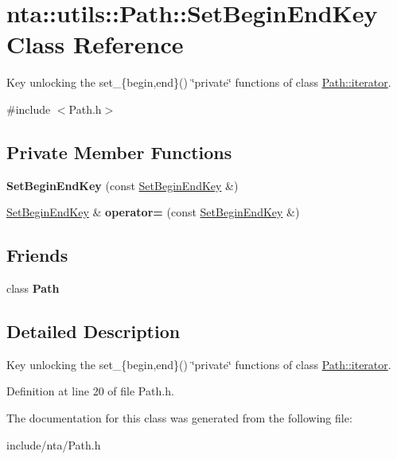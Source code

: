 \hypertarget{classnta_1_1utils_1_1Path_1_1SetBeginEndKey}{}\section{nta\+:\+:utils\+:\+:Path\+:\+:Set\+Begin\+End\+Key Class Reference}
\label{classnta_1_1utils_1_1Path_1_1SetBeginEndKey}


Key unlocking the set\+\_\+\{begin,end\}() \char`\"{}private\char`\"{} functions of class \hyperlink{classnta_1_1utils_1_1Path_1_1iterator}{Path\+::iterator}.  




{\ttfamily \#include $<$Path.\+h$>$}

\subsection*{Private Member Functions}
\begin{DoxyCompactItemize}
\item 
\mbox{\label{classnta_1_1utils_1_1Path_1_1SetBeginEndKey_a1e1243d2e94e7a5f4918cd4386a8e045}} 
{\bfseries Set\+Begin\+End\+Key} (const \hyperlink{classnta_1_1utils_1_1Path_1_1SetBeginEndKey}{Set\+Begin\+End\+Key} \&)
\item 
\mbox{\label{classnta_1_1utils_1_1Path_1_1SetBeginEndKey_a84a9f5c84d52a1564b167a43af7e9ec0}} 
\hyperlink{classnta_1_1utils_1_1Path_1_1SetBeginEndKey}{Set\+Begin\+End\+Key} \& {\bfseries operator=} (const \hyperlink{classnta_1_1utils_1_1Path_1_1SetBeginEndKey}{Set\+Begin\+End\+Key} \&)
\end{DoxyCompactItemize}
\subsection*{Friends}
\begin{DoxyCompactItemize}
\item 
\mbox{\label{classnta_1_1utils_1_1Path_1_1SetBeginEndKey_a4877239a6b7f09fbf5a61ca68a49d74c}} 
class {\bfseries Path}
\end{DoxyCompactItemize}


\subsection{Detailed Description}
Key unlocking the set\+\_\+\{begin,end\}() \char`\"{}private\char`\"{} functions of class \hyperlink{classnta_1_1utils_1_1Path_1_1iterator}{Path\+::iterator}. 

Definition at line 20 of file Path.\+h.



The documentation for this class was generated from the following file\+:\begin{DoxyCompactItemize}
\item 
include/nta/Path.\+h\end{DoxyCompactItemize}
